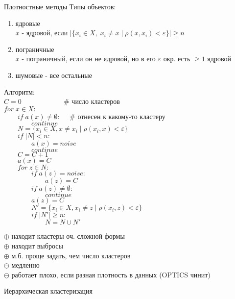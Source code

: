 \documentclass[final]{beamer}
\newlength{\colwidth}
\begin{document}
\begin{frame}[t]
\begin{columns}[t]
\begin{column}{\colwidth}
\begin{block}{Плотностные методы}
{\small Типы объектов:}
\begin{enumerate}
    \item {\small ядровые}\\
$x$ - {\small ядровой, если } $\left|\{x_i \in X, \; x_i \ne x \; | \; \rho(x, x_i) < \varepsilon \}\right| \ge n$
    \item {\small пограничные}\\
$x$ - {\small пограничный, если он не ядровой, но в его } $\varepsilon$ {\small окр. есть } $\ge 1$ {\small ядровой}
    \item {\small шумовые - все остальные}
\end{enumerate}
{\small Алгоритм:}\\
$C = 0 \quad \quad \quad \quad \quad \; \; \;$ {\small \# число кластеров}\\
$for \; x \in X:$\\
$\quad \quad if \; a(x) \ne \emptyset: \quad $ {\small \# отнесен к какому-то кластеру}\\
$\quad \quad \quad \quad continue$\\
$\quad \quad N = \{x_i \in X, x \ne x_i \; | \; \rho(x_i,x) < \varepsilon \}$\\
$\quad \quad if \; |N| < n:$\\
$\quad \quad \quad \quad a(x) = noise$\\
$\quad \quad \quad \quad continue$\\
$\quad \quad C = C + 1$\\
$\quad \quad a(x) = C$\\
$\quad \quad for \; z \in N:$\\
$\quad \quad \quad \quad if \; a(z) = noise:$\\
$\quad \quad \quad \quad \quad \quad a(z) = C$\\
$\quad \quad \quad \quad if \; a(z) \ne \emptyset:$\\
$\quad \quad \quad \quad \quad \quad continue$\\
$\quad \quad \quad \quad a(z) = C$\\
$\quad \quad \quad \quad N' = \{x_i \in X, x_i \ne z \; | \; \rho(x_i, z) < \varepsilon \}$\\
$\quad \quad \quad \quad if \; |N'| \ge n:$\\
$\quad \quad \quad \quad \quad \quad N = N \cup N'$

$\oplus$ {\small находит кластеры оч. сложной формы}\\
$\oplus$ {\small находит выбросы}\\
$\oplus$ {\small м.б. проще задать, чем число кластеров}\\
$\ominus$ {\small медленно}\\
$\ominus$ {\small работает плохо, если разная плотность в данных (OPTICS чинит)}
\end{block}
\begin{block}{Иерархическая кластеризация}


\end{block}
\end{column}
\end{columns}
\end{frame}
\end{document}
